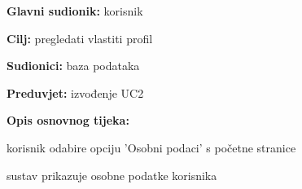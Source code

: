                    
                    \noindent {}
					\begin{packed_item}
	
						\item \textbf{Glavni sudionik: }korisnik
						\item  \textbf{Cilj:} pregledati vlastiti profil
						\item  \textbf{Sudionici:} baza podataka
						\item  \textbf{Preduvjet:} izvođenje UC2
						\item  \textbf{Opis osnovnog tijeka:}
						
						\item[] \begin{packed_enum}
	
							\item korisnik odabire opciju 'Osobni podaci' s početne stranice
							\item sustav prikazuje osobne podatke korisnika 
			
						\end{packed_enum}
						
						
					\end{packed_item}

